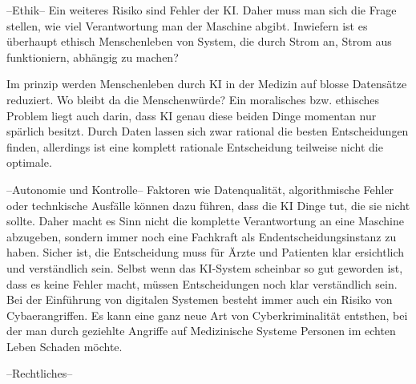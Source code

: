 --Ethik--
Ein weiteres Risiko sind Fehler der KI. Daher muss man sich die Frage stellen, wie viel Verantwortung man der Maschine abgibt.
Inwiefern ist es überhaupt ethisch Menschenleben von System, die durch Strom an, Strom aus funktioniern, abhängig zu machen?

Im prinzip werden Menschenleben durch KI in der Medizin auf blosse Datensätze reduziert. Wo bleibt da die Menschenwürde?
Ein moralisches bzw. ethisches Problem liegt auch darin, dass KI genau diese beiden Dinge momentan nur spärlich besitzt. 
Durch Daten lassen sich zwar rational  die besten Entscheidungen finden, allerdings ist eine komplett rationale Entscheidung teilweise nicht die optimale.

--Autonomie und Kontrolle--
Faktoren wie Datenqualität, algorithmische Fehler oder technkische Ausfälle können dazu führen, dass die KI Dinge tut, die sie nicht sollte. 
Daher macht es Sinn nicht die komplette Verantwortung an eine Maschine abzugeben, sondern immer noch eine Fachkraft als Endentscheidungsinstanz zu haben.
Sicher ist, die Entscheidung muss für Ärzte und Patienten klar ersichtlich und verständlich sein. Selbst wenn das KI-System scheinbar so gut geworden ist, dass es keine Fehler macht, 
müssen Entscheidungen noch klar verständlich sein. Bei der Einführung von digitalen Systemen besteht immer auch ein  Risiko von Cybaerangriffen.
Es kann eine ganz neue Art von Cyberkriminalität entsthen, bei der man durch geziehlte Angriffe auf Medizinische Systeme Personen im echten Leben Schaden möchte.


--Rechtliches--
